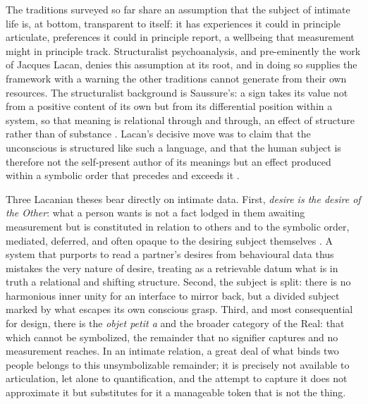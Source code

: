\documentclass[11pt,a4paper]{article}
\begin{document}
The traditions surveyed so far share an assumption that the subject of intimate life is, at bottom, transparent to itself: it has experiences it could in principle articulate, preferences it could in principle report, a wellbeing that measurement might in principle track. Structuralist psychoanalysis, and pre-eminently the work of Jacques Lacan, denies this assumption at its root, and in doing so supplies the framework with a warning the other traditions cannot generate from their own resources. The structuralist background is Saussure's: a sign takes its value not from a positive content of its own but from its differential position within a system, so that meaning is relational through and through, an effect of structure rather than of substance \parencite{saussure1916course}. Lacan's decisive move was to claim that the unconscious is structured like such a language, and that the human subject is therefore not the self-present author of its meanings but an effect produced within a symbolic order that precedes and exceeds it \parencite{lacan2006ecrits}.

Three Lacanian theses bear directly on intimate data. First, \emph{desire is the desire of the Other}: what a person wants is not a fact lodged in them awaiting measurement but is constituted in relation to others and to the symbolic order, mediated, deferred, and often opaque to the desiring subject themselves \parencite{lacan1977four}. A system that purports to read a partner's desires from behavioural data thus mistakes the very nature of desire, treating as a retrievable datum what is in truth a relational and shifting structure. Second, the subject is split: there is no harmonious inner unity for an interface to mirror back, but a divided subject marked by what escapes its own conscious grasp. Third, and most consequential for design, there is the \emph{objet petit a} and the broader category of the Real: that which cannot be symbolized, the remainder that no signifier captures and no measurement reaches. In an intimate relation, a great deal of what binds two people belongs to this unsymbolizable remainder; it is precisely not available to articulation, let alone to quantification, and the attempt to capture it does not approximate it but substitutes for it a manageable token that is not the thing.
\end{document}
